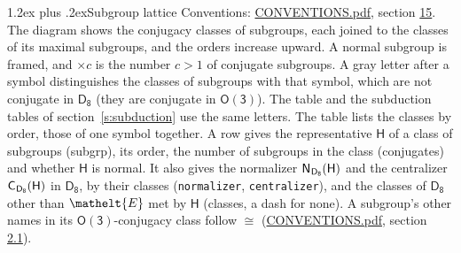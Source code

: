 \documentclass[10pt,a4paper]{article}
\makeatletter
\renewcommand\section{\@startsection{section}{1}{\z@}{-3ex plus -1ex minus -.2ex}%
  {1.2ex plus .2ex}{\normalfont\large\sffamily\bfseries\color{parttitle}}}
\numberwithin{equation}{section}
\newcommand{\eltfont}[1]{{\let\sigma\eltsigma\mathelt{#1}}}
\newcommand{\grp}[1]{\mathsf{#1}}
\newcommand{\cls}[1]{\eltfont{#1}}
\newcommand{\samecls}{\cong}
\newcommand{\hairsp}{\mkern1mu}
\makeatother
\begin{document}
\section{Subgroup lattice}\label{s:subgroups}
Conventions: \href{../../CONVENTIONS.pdf}{CONVENTIONS.pdf}, section \href{../../CONVENTIONS.pdf\#conv.15}{15}.
The diagram shows the conjugacy classes of subgroups, each joined to the classes of its maximal subgroups, and the orders increase upward. A normal subgroup is framed, and ${\times}c$ is the number $c > 1$ of conjugate subgroups. A gray letter after a symbol distinguishes the classes of subgroups with that symbol, which are not conjugate in $\grp{D_{8}}$ (they are conjugate in \href{O3.pdf}{$\grp{O(3)}$}). The table and the subduction tables of section~\ref{s:subduction} use the same letters. The table lists the classes by order, those of one symbol together. \label{n:group.H}\label{n:head.subgroup}\label{n:head.order}\label{n:head.conjugates}\label{n:head.normal}A row gives the representative $\grp{H}$ of a class of subgroups (subgrp), its order, the number of subgroups in the class (conjugates) and whether $\grp{H}$ is normal. \label{n:group.normalizer}\label{n:group.centralizer}\label{n:head.classes}It also gives the normalizer $\grp{N}_{\hairsp \grp{D_{8}}}(\grp{H})$ and the centralizer $\grp{C}_{\hairsp \grp{D_{8}}}(\grp{H})$ in $\grp{D_{8}}$, by their classes (\texttt{normalizer}, \texttt{centralizer}), and the classes of $\grp{D_{8}}$ other than $\cls{E}$ met by $\grp{H}$ (classes, a dash for none). A subgroup's other names in its \href{O3.pdf}{$\grp{O(3)}$}-conjugacy class follow $\samecls$ (\href{../../CONVENTIONS.pdf}{CONVENTIONS.pdf}, section \href{../../CONVENTIONS.pdf\#conv.2.1}{2.1}).
\end{document}
